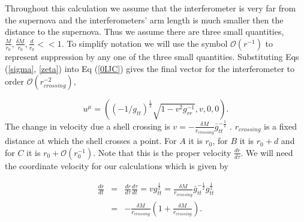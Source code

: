 \documentclass[aps,showpacs,onecolumn,floats,prd,superscriptaddress,nofootinbib]{revtex4-1}
\begin{document}
Throughout this calculation we assume that the interferometer is very far from the supernova and the interferometers' arm length is much smaller then the distance to the supernova. Thus we assume there are three small quantities, $\frac{M}{r_0}, \frac{\delta M}{r_0}, \frac{d}{r_0}<<1$. To simplify notation we will use the symbol $\mathcal{O}(r^{-1})$ to represent suppression by any one of the three small quantities. 
Substituting Eqs (\ref{sigma}, \ref{zeta}) into Eq (\ref{0IJC}) gives the final vector for the interferometer to order $\mathcal{O}(r_{crossing}^{-2})$,

\begin{equation}
	u^\mu = \left( (-1/g_{tt})^\frac{1}{2} \sqrt{1-v^2g_{rr}^{-1}}, v , 0, 0 \right).	\label{5}
\end{equation}
The change in velocity due a shell crossing is $v = -\frac{\delta M}{r_{crossing}} \bar{g}_{tt}^{-\frac{1}{2}} $ . $r_{crossing}$ is a fixed distance at which the shell crosses a point. For $A$ it is $r_0$, for $B$ it is $r_0 + d$ and for $C$ it is $r_0 + \mathcal{O}(r_0^{-1})$. Note that this is the proper velocity $\frac{dr}{d\tau}$. We will need the coordinate velocity for our calculations which is given by 

\begin{eqnarray}
	\frac{dr}{dt} &=& \frac{dr}{d \tau} \frac{d \tau}{dt} = v g_{tt}^{\frac{1}{2}} =  \frac{\delta M}{r_{crossing}} \bar{g}_{tt}^{-\frac{1}{2}} g_{tt}^\frac{1}{2} \nonumber \\
	&=& -\frac{\delta M}{r_{crossing}} \left( 1 + \frac{\delta M}{r_{crossing}} \right).
\end{eqnarray}
\end{document}
